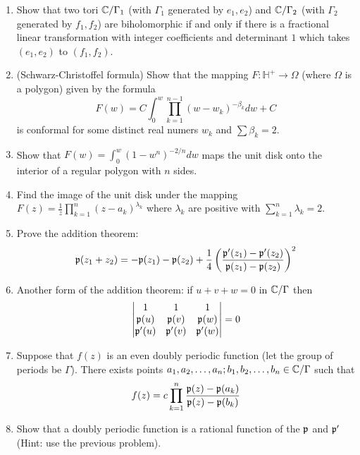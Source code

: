 \documentclass[letterpaper, 12pt]{article}
\begin{document}
\begin{enumerate}
    \item
    Show that two tori \(\mathbb{C} / \Gamma_1\) (with \(\Gamma_1\) generated by \(e_1, e_2\)) and \(\mathbb{C}/\Gamma_2\) (with \(\Gamma_2\) generated by \(f_1, f_2\)) are biholomorphic if and only if there is a fractional linear transformation with integer coefficients and determinant \(1\) which takes \((e_1, e_2)\) to \((f_1, f_2)\).
    
    \item
    (Schwarz-Christoffel formula) Show that the mapping \(F: \mathbb{H}^+ \to \Omega\) (where \(\Omega\) is a polygon) given by the formula
    \[ F(w) = C \int_0^w \prod_{k=1}^{n-1} (w - w_k)^{-\beta_k} dw + C\]
        is conformal for some distinct real numers \(w_k\) and \(\sum \beta_k = 2\).
        
    \item
    Show that \(F(w) = \int_0^w (1-w^n)^{-2/n} dw\) maps the unit disk onto the interior of a regular polygon with \(n\) sides.
    
    \item
    Find the image of the unit disk under the mapping \(F(z) = \frac{1}{z} \prod_{k=1}^n (z-a_k)^{\lambda_k} \) where \(\lambda_k\) are positive with \(\sum_{k=1}^n \lambda_k = 2\).

    \item
    Prove the addition theorem:
    \[\mathfrak{p}(z_1+z_2) = - \mathfrak{p}(z_1) - \mathfrak{p}(z_2) + \frac{1}{4} \left( \frac{\mathfrak{p}'(z_1) - \mathfrak{p}'(z_2)}{\mathfrak{p}(z_1) - \mathfrak{p}(z_2)} \right)^2\]
        
    \item
    Another form of the addition theorem: if \(u + v + w = 0\) in \(\mathbb{C}/\Gamma\) then
    \[
    \begin{vmatrix}
    1 & 1 & 1 \\
    \mathfrak{p}(u) & \mathfrak{p}(v) & \mathfrak{p}(w) \\
    \mathfrak{p}'(u) & \mathfrak{p}'(v) & \mathfrak{p}'(w)
    \end{vmatrix}
    = 0
    \]

    \item
    Suppose that \(f(z)\) is an even doubly periodic function (let the group of periods be \(\Gamma\)). There exists points \(a_1, a_2, \dots, a_n; b_1, b_2, \dots, b_n \in \mathbb{C}/\Gamma\) such that 
    \[ f(z) = c \prod_{k=1}^n \frac{\mathfrak{p}(z) - \mathfrak{p}(a_k)}{\mathfrak{p}(z) - \mathfrak{p}(b_k)}\]
            
    \item
    Show that a doubly periodic function is a rational function of the \(\mathfrak{p}\) and \(\mathfrak{p}'\) (Hint: use the previous problem).


\end{enumerate}
\end{document}
